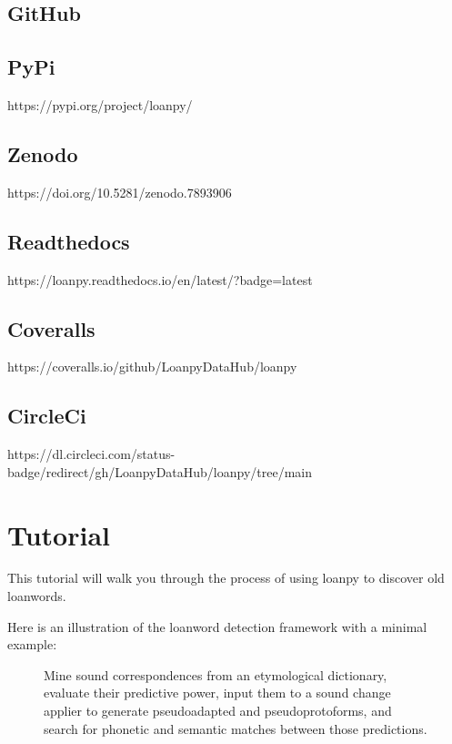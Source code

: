 \documentclass[letterpaper,10pt,english]{sphinxmanual}
\begin{document}
\section{GitHub}
\label{\detokenize{home:github}}


\section{PyPi}
\label{\detokenize{home:pypi}}
https://pypi.org/project/loanpy/


\section{Zenodo}
\label{\detokenize{home:zenodo}}
https://doi.org/10.5281/zenodo.7893906


\section{Readthedocs}
\label{\detokenize{home:readthedocs}}
https://loanpy.readthedocs.io/en/latest/?badge=latest


\section{Coveralls}
\label{\detokenize{home:coveralls}}
https://coveralls.io/github/LoanpyDataHub/loanpy


\section{CircleCi}
\label{\detokenize{home:circleci}}
https://dl.circleci.com/status-badge/redirect/gh/LoanpyDataHub/loanpy/tree/main

\sphinxstepscope


\chapter{Tutorial}
\label{\detokenize{tutorial:tutorial}}\label{\detokenize{tutorial::doc}}
\sphinxAtStartPar
This tutorial will walk you through the process of using loanpy to
discover old loanwords.

\sphinxAtStartPar
Here is an illustration of the loanword detection framework with a minimal
example:

\begin{figure}[htbp]
\centering
\capstart

\noindent{}
\caption{Mine sound
correspondences from an etymological dictionary, evaluate their predictive
power, input them to a sound change applier to generate pseudo\sphinxhyphen{}adapted and
pseudo\sphinxhyphen{}proto\sphinxhyphen{}forms, and search for phonetic and semantic matches between
those predictions.}\label{\detokenize{tutorial:id1}}\end{figure}
\end{document}
